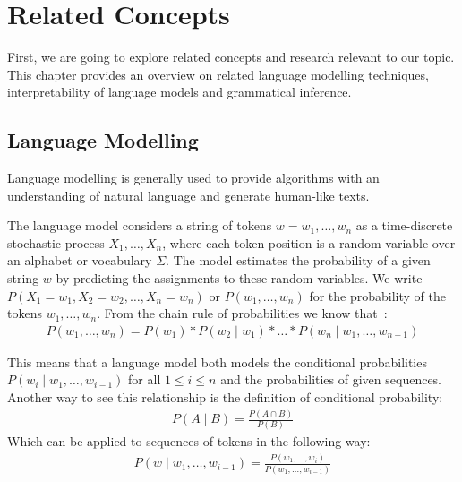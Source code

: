 
\chapter{Related Concepts}\label{chp:related}
First, we are going to explore related concepts and research relevant to our topic. This chapter provides an overview on related language modelling techniques, interpretability of language models and grammatical inference.

\section{Language Modelling}
Language modelling is generally used to provide algorithms with an understanding of natural language and generate human-like texts.

\noindent
The language model considers a string of tokens $w = w_1, \ldots, w_n$ as a time-discrete stochastic process $X_1, \ldots, X_n$, where each token position is a random variable over an alphabet or vocabulary $\Sigma$. The model estimates the probability of a given string $w$ by predicting the assignments to these random variables. We write $P(X_1 = w_1, X_2 = w_2, \ldots, X_n = w_n)$ or $P(w_1, \ldots, w_n)$ for the probability of the tokens $w_1, \ldots, w_n$.
From the chain rule of probabilities we know that~\cite{parsing2009speech}:
\begin{align*}
    P(w_1, \ldots, w_n) = P(w_1)*P(w_2 \mid w_1)*\ldots*P(w_n \mid w_1, \ldots, w_{n-1})
\end{align*}

\noindent
This means that a language model both models the conditional probabilities $P(w_i \mid w_1, \ldots, w_{i-1})$ for all $1 \leq i \leq n$ and the probabilities of given sequences. Another way to see this relationship is the definition of conditional probability:
\begin{align*}
    P(A \mid B) = \frac{P(A \cap B)}{P(B)}
\end{align*}
Which can be applied to sequences of tokens in the following way:
\begin{align*}
    P(w \mid w_1, \ldots, w_{i-1}) = \frac{P(w_1, \ldots, w_i)}{P(w_1, \ldots, w_{i-1})}
\end{align*}

